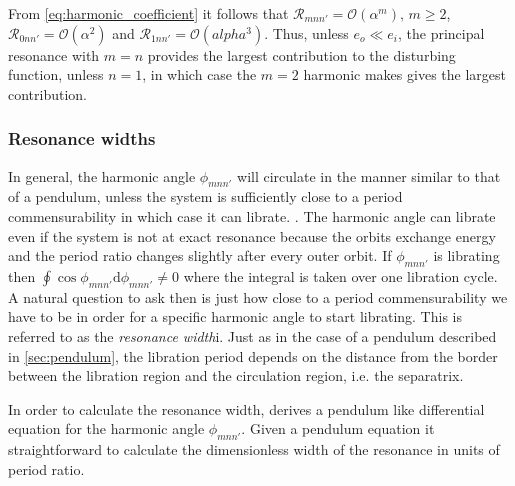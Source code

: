 From \cref{eq:harmonic_coefficient} it follows that $\mathcal{R}
_{mnn'}=\mathcal{O}(\alpha^m),\,m\geq 2$, $\mathcal{R}_{0nn'}=
\mathcal{O}(\alpha^2)$ and $\mathcal{R}_{1nn'}=\mathcal{O}(
alpha^3)$. Thus, unless $e_o\ll e_i$, the principal resonance
with $m=n$ provides the largest contribution to the disturbing
function, unless $n=1$, in which case the $m=2$ harmonic makes
gives the largest contribution.
\subsubsection{Resonance widths}
\label{ssub:Resonance_widths}
In general, the harmonic angle $\phi_{mnn'}$ will circulate in the
manner similar to that of a pendulum, unless the system is 
sufficiently close to a period commensurability in which case
it can librate. 
. The harmonic angle
can librate even if the system is not at exact resonance
because the orbits exchange energy and the period ratio changes
slightly after every outer orbit. If $\phi_{mnn'}$ is librating
 then $\oint\cos\phi_{mnn'}\mathrm{d}\phi_{mnn'}\neq 0$ where the
integral is taken over one libration cycle. A natural 
question to ask then is just how close to a period commensurability
we have to be in order for a specific harmonic angle to start
librating. This is referred to as the \emph{resonance width}i. 
Just as in the case of a pendulum described in 
\cref{sec:pendulum}, the libration period 
depends on the distance from the border between the libration region
and the circulation region, i.e. the separatrix.  

In order to calculate the resonance width, \cite{Mardling2013} derives
a pendulum like differential equation for the harmonic angle $\phi_{mnn'}$.
Given a pendulum equation it straightforward to calculate the dimensionless
width of the resonance in units of period ratio.

